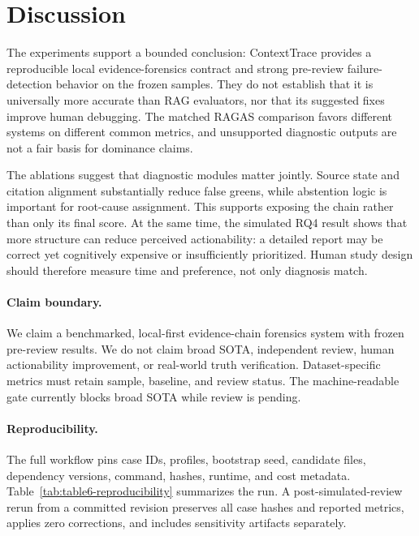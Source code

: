 \section{Discussion}
The experiments support a bounded conclusion: ContextTrace provides a
reproducible local evidence-forensics contract and strong pre-review
failure-detection behavior on the frozen samples. They do not establish that it
is universally more accurate than RAG evaluators, nor that its suggested fixes
improve human debugging. The matched RAGAS comparison favors different systems
on different common metrics, and unsupported diagnostic outputs are not a fair
basis for dominance claims.

The ablations suggest that diagnostic modules matter jointly. Source state and
citation alignment substantially reduce false greens, while abstention logic is
important for root-cause assignment. This supports exposing the chain rather
than only its final score. At the same time, the simulated RQ4 result shows that
more structure can reduce perceived actionability: a detailed report may be
correct yet cognitively expensive or insufficiently prioritized. Human study
design should therefore measure time and preference, not only diagnosis match.

\paragraph{Claim boundary.}
We claim a benchmarked, local-first evidence-chain forensics system with frozen
pre-review results. We do not claim broad SOTA, independent review, human
actionability improvement, or real-world truth verification. Dataset-specific
metrics must retain sample, baseline, and review status. The machine-readable
gate currently blocks broad SOTA while review is pending.

\paragraph{Reproducibility.}
The full workflow pins case IDs, profiles, bootstrap seed, candidate files,
dependency versions, command, hashes, runtime, and cost metadata.
Table~\ref{tab:table6-reproducibility} summarizes the run. A post-simulated-review
rerun from a committed revision preserves all case hashes and reported metrics,
applies zero corrections, and includes sensitivity artifacts separately.


